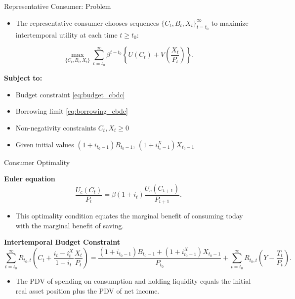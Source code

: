 \documentclass[11pt,aspectratio=169]{beamer}
\begin{document}
\begin{frame}{Representative Consumer: Problem}
\small
\begin{itemize}
    \item The representative consumer chooses sequences 
$\{C_t, B_t, X_t\}_{t=t_0}^\infty$ 
to maximize intertemporal utility at each time $t\geq t_0$:
\end{itemize}
\[
\max_{\{C_t, B_t, X_t\}} \sum_{t=t_0}^{\infty} 
\beta^{t-t_0} 
\left\{
U(C_t) 
+ V\!\left(\frac{X_t}{P_t}\right)
\right\}.
\]

\textbf{Subject to:}
\begin{itemize}
  \item Budget constraint \eqref{eq:budget_cbdc}
  \item Borrowing limit \eqref{eq:borrowing_cbdc}
  \item Non-negativity constraints $C_t, X_t \ge 0$
  \item Given initial values 
  $(1+i_{t_0-1})B_{t_0-1}$, $(1+i_{t_0-1}^{X})X_{t_0-1}$
\end{itemize}
\end{frame}

\begin{frame}[label=euler]{Consumer Optimality}
\small


\vspace{0.2cm}

\textbf{Euler equation}
\begin{equation}
  \frac{U_c(C_t)}{P_t}
  = 
  \beta (1+i_t)
  \frac{U_c(C_{t+1})}{P_{t+1}}.
\label{Euler-CBDC}
\end{equation}

\begin{itemize}
    \item This optimality condition equates the marginal benefit of consuming today with the marginal benefit of saving.
\end{itemize}

\vspace{0.25cm}

\textbf{Intertemporal Budget Constraint}
\begin{equation}
\sum_{t=t_0}^{\infty} 
R_{t_0,t}
\left(
C_t
+
\frac{i_t - i_t^{X}}{1+i_t}
\frac{X_t}{P_t}
\right)
=
\frac{(1+i_{t_0-1})B_{t_0-1}
+ (1+i_{t_0-1}^{X})X_{t_0-1}}{P_{t_0}}
+
\sum_{t=t_0}^{\infty} 
R_{t_0,t}
\left(
Y - \frac{T_t}{P_t}
\right).
\label{eq:ibc_opt_cbdc}
\end{equation}

\begin{itemize}
  \item The PDV of spending on consumption and holding liquidity equals the initial real asset position plus the PDV of net income.
\end{itemize}

\begin{center}
\hyperlink{euler_proof}{}
\end{center}

\end{frame}
\end{document}
